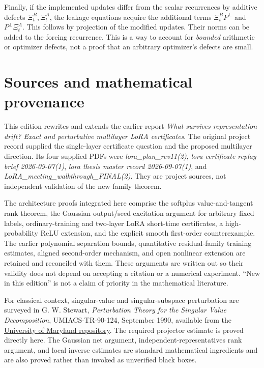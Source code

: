 \documentclass[12pt,a4paper]{article}
\theoremstyle{readable}
\theoremstyle{definition}\newtheorem{example}[theorem]{Example}
\begin{document}
Finally, if the implemented updates differ from the scalar recurrences by additive defects \(\Xi_t^B,\Xi_t^A\), the leakage equations acquire the additional terms \(\Xi_t^BP^\perp\) and \(P^\perp\Xi_t^A\). This follows by projection of the modified updates. Their norms can be added to the forcing recurrence. This is a way to account for \emph{bounded} arithmetic or optimizer defects, not a proof that an arbitrary optimizer's defects are small.

\section*{Sources and mathematical provenance}
This edition rewrites and extends the earlier report \emph{What survives representation drift? Exact and perturbative multilayer LoRA certificates}. The original project record supplied the single-layer certificate question and the proposed multilayer direction. Its four supplied PDFs were \emph{lora\_plan\_rev11(2)}, \emph{lora certificate replay brief 2026-09-07(1)}, \emph{lora thesis master record 2026-09-07(1)}, and \emph{LoRA\_meeting\_walkthrough\_FINAL(2)}. They are project sources, not independent validation of the new family theorem.

The architecture proofs integrated here comprise the softplus value-and-tangent rank theorem, the Gaussian output/seed excitation argument for arbitrary fixed labels, ordinary-training and two-layer LoRA short-time certificates, a high-probability ReLU extension, and the explicit smooth first-order counterexample. The earlier polynomial separation bounds, quantitative residual-family training estimates, aligned second-order mechanism, and open nonlinear extension are retained and reconciled with them. These arguments are written out so their validity does not depend on accepting a citation or a numerical experiment. ``New in this edition'' is not a claim of priority in the mathematical literature.

For classical context, singular-value and singular-subspace perturbation are surveyed in G. W. Stewart, \emph{Perturbation Theory for the Singular Value Decomposition}, UMIACS-TR-90-124, September 1990, available from the \href{https://drum.lib.umd.edu/bitstreams/a38cc6db-9bb7-4f3b-ae43-55b5827bb9d4/download}{University of Maryland repository}. The required projector estimate is proved directly here. The Gaussian net argument, independent-representatives rank argument, and local inverse estimates are standard mathematical ingredients and are also proved rather than invoked as unverified black boxes.
\end{document}
